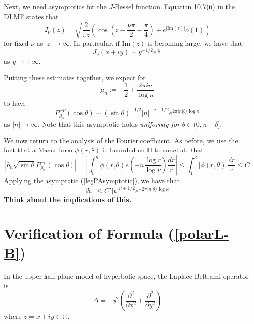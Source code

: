 \documentclass[]{article}
\begin{document}
Next, we need asymptotics for the $J$-Bessel function.
Equation 10.7(ii) in the DLMF states that
$$
J_\nu(z) = \sqrt{\frac{2}{\pi z}}\left( \cos\left(z - \frac{\nu\pi}{2} - \frac{\pi}{4}\right) + e^{|\text{Im}(z)|}o(1) \right)
$$
for fixed $\nu$ as $|z| \rightarrow \infty$.
In particular, if $\text{Im}(z)$ is becoming large, we have that
$$
J_\nu(x + iy) \sim y^{-1/2}e^{|y|}
$$
as $y \rightarrow \pm\infty$.

Putting these estimates together, we expect for
$$
\mu_n := -\frac{1}{2} + \frac{2\pi in}{\log\kappa}
$$
to have
\begin{equation}\label{legPAsymptotic}
P_{\mu_n}^{-\nu}(\cos\theta) \sim (\sin\theta)^{-1/2}|n|^{-\nu-1/2}e^{2\pi|n|\theta/\log\kappa}
\end{equation}
as $|n| \rightarrow \infty$.
Note that this asymptotic holds \textit{uniformly for} $\theta \in (0, \pi - \delta]$.

We now return to the analysis of the Fourier coefficient.
As before, we use the fact that a Maass form $\phi(r, \theta)$ is bounded on $\mathbb{H}$ to conclude that
$$
|b_n\sqrt{\sin\theta}P_{\mu_n}^{-\nu}(\cos\theta)| =
\left| \int_{1}^{\kappa}\phi(r, \theta)e\left( -n\frac{\log r}{\log\kappa} \right)\frac{dr}{r}\right| \leq \int_{1}^{\kappa}|\phi(r, \theta)|\frac{dr}{r} \leq C
$$
Applying the asymptotic (\ref{legPAsymptotic}), we have that
$$
|b_n| \leq C'|n|^{\nu+1/2}e^{-2\pi|n|\theta/\log\kappa}
$$
\textbf{Think about the implications of this.}

\section*{Verification of Formula (\ref{polarL-B})}

In the upper half plane model of hyperbolic space, the Laplace-Beltrami operator is
$$
\Delta = -y^2\left( \frac{\partial^2}{\partial x^2} + \frac{\partial^2}{\partial y^2} \right)
$$
where $z = x + iy \in \mathbb{H}$.
\\
\end{document}
